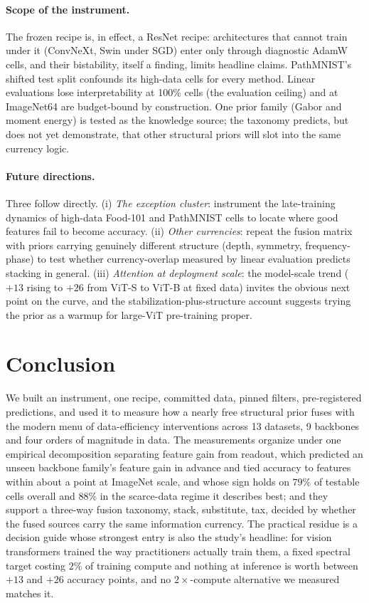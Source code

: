 \paragraph{Scope of the instrument.} The frozen recipe is, in effect, a
ResNet recipe: architectures that cannot train under it (ConvNeXt, Swin
under SGD) enter only through diagnostic AdamW cells, and their
bistability, itself a finding, limits headline claims. PathMNIST's
shifted test split confounds its high-data cells for every method. Linear
evaluations lose interpretability at 100\% cells (the evaluation ceiling)
and at ImageNet64
are budget-bound by construction. One prior family (Gabor and moment energy)
is tested as the knowledge source; the taxonomy predicts, but does not
yet demonstrate, that other structural priors will slot into the same
currency logic.

\paragraph{Future directions.} Three follow directly. (i) \emph{The
exception cluster}: instrument the late-training dynamics of high-data
Food-101 and PathMNIST cells to locate where good features fail to become
accuracy. (ii) \emph{Other currencies}: repeat the fusion matrix with
priors carrying genuinely different structure (depth, symmetry,
frequency-phase) to test whether currency-overlap measured by linear evaluation
predicts stacking in general. (iii) \emph{Attention at deployment
scale}: the model-scale trend ($+13$ rising to $+26$ from ViT-S to ViT-B at fixed
data) invites the obvious next point on the curve, and the
stabilization-plus-structure account suggests trying the prior as a
warmup for large-ViT pre-training proper.

\section{Conclusion}\label{sec:conclusion}

We built an instrument, one recipe, committed data, pinned filters,
pre-registered predictions, and used it to measure how a nearly free
structural prior fuses with the modern menu of data-efficiency
interventions across 13 datasets, 9 backbones and four orders of
magnitude in data. The measurements organize under one empirical
decomposition separating feature gain from readout, which predicted an
unseen backbone family's feature gain in advance and tied accuracy to
features within about a point at ImageNet scale, and whose sign holds on
$79\%$ of testable cells overall and $88\%$ in the scarce-data regime it
describes best; and they support a three-way fusion taxonomy, stack,
substitute, tax, decided by whether the fused sources carry the same
information currency. The
practical residue is a decision guide whose strongest entry is also the
study's headline: for vision transformers trained the way practitioners
actually train them, a fixed spectral target costing $2\%$ of training
compute and nothing at inference is worth between $+13$ and $+26$
accuracy points, and no $2\times$-compute alternative we measured matches
it.
